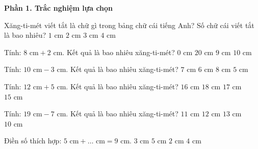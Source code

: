 \textbf{Phần 1. Trắc nghiệm lựa chọn}

\begin{ex} %
Xăng-ti-mét viết tắt là chữ gì trong bảng chữ cái tiếng Anh? Số chữ cái viết tắt là bao nhiêu?
\choice
{$1\text{ cm}$}
{\True $2\text{ cm}$}
{$3\text{ cm}$}
{$4\text{ cm}$}
\end{ex}

\begin{ex} %
Tính: $8\text{ cm} + 2\text{ cm}$. Kết quả là bao nhiêu xăng-ti-mét?
\choice
{$0\text{ cm}$}
{$20\text{ cm}$}
{$9\text{ cm}$}
{\True $10\text{ cm}$}
\end{ex}

\begin{ex} %
Tính: $10\text{ cm} - 3\text{ cm}$. Kết quả là bao nhiêu xăng-ti-mét?
\choice
{\True $7\text{ cm}$}
{$6\text{ cm}$}
{$8\text{ cm}$}
{$5\text{ cm}$}
\end{ex}

\begin{ex} %
Tính: $12\text{ cm} + 5\text{ cm}$. Kết quả là bao nhiêu xăng-ti-mét?
\choice
{$16\text{ cm}$}
{$18\text{ cm}$}
{\True $17\text{ cm}$}
{$15\text{ cm}$}
\end{ex}

\begin{ex} %
Tính: $19\text{ cm} - 7\text{ cm}$. Kết quả là bao nhiêu xăng-ti-mét?
\choice
{$11\text{ cm}$}
{\True $12\text{ cm}$}
{$13\text{ cm}$}
{$10\text{ cm}$}
\end{ex}

\begin{ex} %
Điền số thích hợp: $5\text{ cm} + \dots\text{ cm} = 9\text{ cm}$.
\choice
{$3\text{ cm}$}
{$5\text{ cm}$}
{$2\text{ cm}$}
{\True $4\text{ cm}$}
\end{ex}

